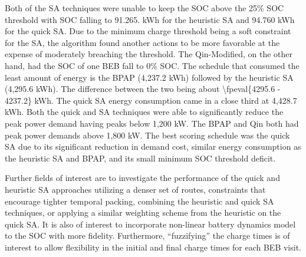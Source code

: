 \documentclass[energies,article,submit,moreauthors]{Definitions/mdpi}
\begin{document}
Both of the SA techniques were unable to keep the SOC above the 25\% SOC threshold with SOC falling to 91.265. kWh for
the heuristic SA and 94.760 kWh for the quick SA. Due to the minimum charge threshold being a soft constraint for the
SA, the algorithm found another actions to be more favorable at the expense of moderately breaching the threshold. The
Qin-Modified, on the other hand, had the SOC of one BEB fall to 0\% SOC. The schedule that consumed the least amount of
energy is the BPAP (4,237.2 kWh) followed by the heuristic SA (4,295.6 kWh). The difference between the two being about
\num{\fpeval{4295.6 - 4237.2}} kWh. The quick SA energy consumption came in a close third at 4,428.7 kWh. Both
the quick and SA techniques were able to significantly reduce the peak power demand having peaks below 1,200 kW. The
BPAP and Qin both had peak power demands above 1,800 kW. The best scoring schedule was the quick SA due to its
significant reduction in demand cost, similar energy consumption as the heuristic SA and BPAP, and its small minimum SOC
threshold deficit.

Further fields of interest are to investigate the performance of the quick and heuristic SA approaches utilizing a
denser set of routes, constraints that encourage tighter temporal packing, combining the heuristic and quick SA
techniques, or applying a similar weighting scheme from the heuristic on the quick SA. It is also of interest to
incorporate non-linear battery dynamics model to the SOC with more fidelity. Furthermore, ``fuzzifying'' the charge times
is of interest to allow flexibility in the initial and final charge times for each BEB visit.
\vspace{6pt}



\end{document}
